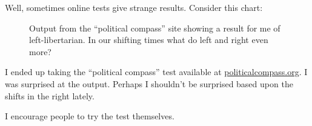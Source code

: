 Well, sometimes online tests give strange results. Consider this chart:

\begin{figure}
\centering
{}
\caption{Output from the ``political compass'' site showing a result for
me of left-libertarian. In our shifting times what do left and right
even more?}
\end{figure}

I ended up taking the ``political compass'' test available at
\href{https://www.politicalcompass.org/}{politicalcompass.org}. I was
surprised at the output. Perhaps I shouldn't be surprised based upon the
shifts in the right lately.

I encourage people to try the test themselves.
